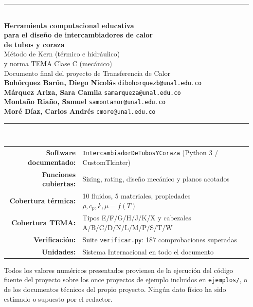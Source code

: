 \documentclass[11pt,a4paper]{article}
\begin{document}
\begin{titlepage}
\centering
\vspace*{1.6cm}
{\color{acento}\rule{\linewidth}{2pt}}\\[1.0cm]
{\Huge\bfseries\color{morado} Herramienta computacional educativa\\[0.4em]
 para el dise\~no de intercambiadores de calor\\[0.4em]
 de tubos y coraza}\\[0.8cm]
{\Large\color{acento} M\'etodo de Kern (t\'ermico e hidr\'aulico)\\[0.2em]
 y norma TEMA Clase C (mec\'anico)}\\[0.5cm]
{\large\color{gristexto} Documento final del proyecto de Transferencia de Calor}\\[0.7cm]
{\large\color{gristexto}
\textbf{Boh\'orquez Bar\'on, Diego Nicol\'as} \quad \texttt{dibohorquezb@unal.edu.co}\\[0.25em]
\textbf{M\'arquez Ariza, Sara Camila} \quad \texttt{samarqueza@unal.edu.co}\\[0.25em]
\textbf{Monta\~no Ria\~no, Samuel} \quad \texttt{samontanor@unal.edu.co}\\[0.25em]
\textbf{Mor\'e D\'iaz, Carlos Andr\'es} \quad \texttt{cmore@unal.edu.co}}\\[1.0cm]
{\color{acento}\rule{\linewidth}{1pt}}\\[1.2cm]
{ \small
\begin{tabular}{rl}
\textbf{Software documentado:} & \texttt{IntercambiadorDeTubosYCoraza} (Python 3 / CustomTkinter)\\
\textbf{Funciones cubiertas:} & Sizing, rating, dise\~no mec\'anico y planos acotados\\
\textbf{Cobertura t\'ermica:} & 10 fluidos, 5 materiales, propiedades $\rho, c_p, k, \mu = f(T)$\\
\textbf{Cobertura TEMA:} & Tipos E/F/G/H/J/K/X y cabezales A/B/C/D/N/L/M/P/S/T/W\\
\textbf{Verificaci\'on:} & Suite \texttt{verificar.py}: 187 comprobaciones superadas\\
\textbf{Unidades:} & Sistema Internacional en todo el documento\\
\end{tabular}}
\vfill
{\small\color{gristexto} Todos los valores num\'ericos presentados provienen de la
 ejecuci\'on del c\'odigo fuente del proyecto sobre los once proyectos de ejemplo
 incluidos en \texttt{ejemplos/}, o de los documentos t\'ecnicos del propio
 proyecto. Ning\'un dato f\'isico ha sido estimado o supuesto por el redactor.}
\end{titlepage}
\end{document}
